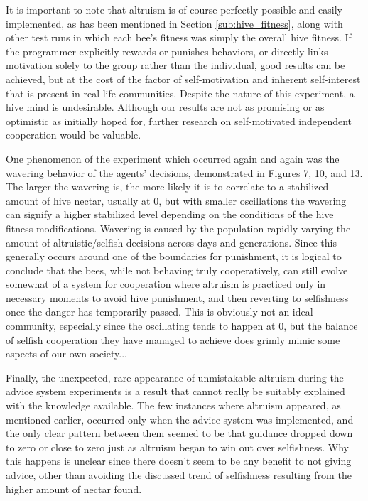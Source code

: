 \documentclass[11pt, letter]{article}
\begin{document}
		It is important to note that altruism is of course perfectly possible and easily implemented, as has been mentioned in Section \ref{sub:hive_fitness}, along with other test runs in which each bee's fitness was simply the overall hive fitness. If the programmer explicitly rewards or punishes behaviors, or directly links motivation solely to the group rather than the individual, good results can be achieved, but at the cost of the factor of self-motivation and inherent self-interest that is present in real life communities. Despite the nature of this experiment, a hive mind is undesirable. Although our results are not as promising or as optimistic as initially hoped for, further research on self-motivated independent cooperation would be valuable. 

        One phenomenon of the experiment which occurred again and again was the wavering behavior of the agents' decisions, demonstrated in Figures 7, 10, and 13. The larger the wavering is, the more likely it is to correlate to a stabilized amount of hive nectar, usually at 0, but with smaller oscillations the wavering can signify a higher stabilized level depending on the conditions of the hive fitness modifications. Wavering is caused by the population rapidly varying the amount of altruistic/selfish decisions across days and generations. Since this generally occurs around one of the boundaries for punishment, it is logical to conclude that the bees, while not behaving truly cooperatively, can still evolve somewhat of a system for cooperation where altruism is practiced only in necessary moments to avoid hive punishment, and then reverting to selfishness once the danger has temporarily passed. This is obviously not an ideal community, especially since the oscillating tends to happen at 0, but the balance of selfish cooperation they have managed to achieve does grimly mimic some aspects of our own society...

        Finally, the unexpected, rare appearance of unmistakable altruism during the advice system experiments is a result that cannot really be suitably explained with the knowledge available. The few instances where altruism appeared, as mentioned earlier, occurred only when the advice system was implemented, and the only clear pattern between them seemed to be that guidance dropped down to zero or close to zero just as altruism began to win out over selfishness. Why this happens is unclear since there doesn't seem to be any benefit to not giving advice, other than avoiding the discussed trend of selfishness resulting from the higher amount of nectar found.	%


	\nocite{*}
	
	
\end{document}
